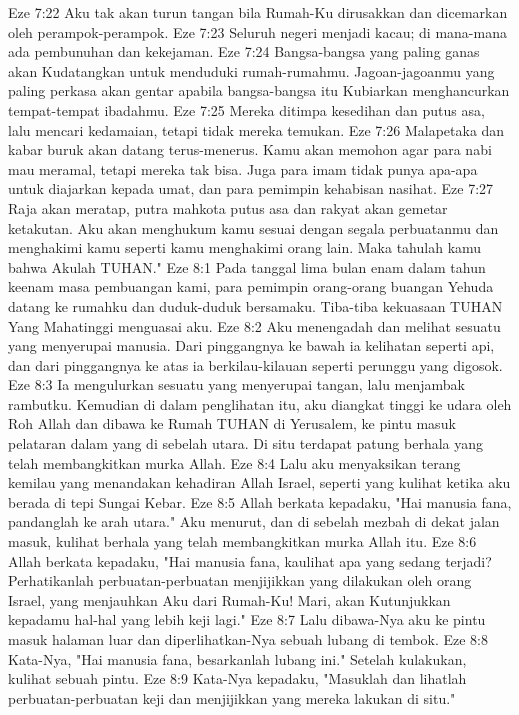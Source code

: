 Eze 7:22  Aku tak akan turun tangan bila Rumah-Ku dirusakkan dan dicemarkan oleh perampok-perampok.
Eze 7:23  Seluruh negeri menjadi kacau; di mana-mana ada pembunuhan dan kekejaman.
Eze 7:24  Bangsa-bangsa yang paling ganas akan Kudatangkan untuk menduduki rumah-rumahmu. Jagoan-jagoanmu yang paling perkasa akan gentar apabila bangsa-bangsa itu Kubiarkan menghancurkan tempat-tempat ibadahmu.
Eze 7:25  Mereka ditimpa kesedihan dan putus asa, lalu mencari kedamaian, tetapi tidak mereka temukan.
Eze 7:26  Malapetaka dan kabar buruk akan datang terus-menerus. Kamu akan memohon agar para nabi mau meramal, tetapi mereka tak bisa. Juga para imam tidak punya apa-apa untuk diajarkan kepada umat, dan para pemimpin kehabisan nasihat.
Eze 7:27  Raja akan meratap, putra mahkota putus asa dan rakyat akan gemetar ketakutan. Aku akan menghukum kamu sesuai dengan segala perbuatanmu dan menghakimi kamu seperti kamu menghakimi orang lain. Maka tahulah kamu bahwa Akulah TUHAN."
Eze 8:1  Pada tanggal lima bulan enam dalam tahun keenam masa pembuangan kami, para pemimpin orang-orang buangan Yehuda datang ke rumahku dan duduk-duduk bersamaku. Tiba-tiba kekuasaan TUHAN Yang Mahatinggi menguasai aku.
Eze 8:2  Aku menengadah dan melihat sesuatu yang menyerupai manusia. Dari pinggangnya ke bawah ia kelihatan seperti api, dan dari pinggangnya ke atas ia berkilau-kilauan seperti perunggu yang digosok.
Eze 8:3  Ia mengulurkan sesuatu yang menyerupai tangan, lalu menjambak rambutku. Kemudian di dalam penglihatan itu, aku diangkat tinggi ke udara oleh Roh Allah dan dibawa ke Rumah TUHAN di Yerusalem, ke pintu masuk pelataran dalam yang di sebelah utara. Di situ terdapat patung berhala yang telah membangkitkan murka Allah.
Eze 8:4  Lalu aku menyaksikan terang kemilau yang menandakan kehadiran Allah Israel, seperti yang kulihat ketika aku berada di tepi Sungai Kebar.
Eze 8:5  Allah berkata kepadaku, "Hai manusia fana, pandanglah ke arah utara." Aku menurut, dan di sebelah mezbah di dekat jalan masuk, kulihat berhala yang telah membangkitkan murka Allah itu.
Eze 8:6  Allah berkata kepadaku, "Hai manusia fana, kaulihat apa yang sedang terjadi? Perhatikanlah perbuatan-perbuatan menjijikkan yang dilakukan oleh orang Israel, yang menjauhkan Aku dari Rumah-Ku! Mari, akan Kutunjukkan kepadamu hal-hal yang lebih keji lagi."
Eze 8:7  Lalu dibawa-Nya aku ke pintu masuk halaman luar dan diperlihatkan-Nya sebuah lubang di tembok.
Eze 8:8  Kata-Nya, "Hai manusia fana, besarkanlah lubang ini." Setelah kulakukan, kulihat sebuah pintu.
Eze 8:9  Kata-Nya kepadaku, "Masuklah dan lihatlah perbuatan-perbuatan keji dan menjijikkan yang mereka lakukan di situ."
